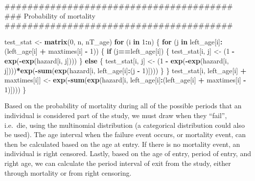 \documentclass[11pt,]{article}
\newenvironment{Shaded}{\begin{snugshade}}{\end{snugshade}}
\newcommand{\KeywordTok}[1]{\textcolor[rgb]{0.13,0.29,0.53}{\textbf{#1}}}
\newcommand{\DecValTok}[1]{\textcolor[rgb]{0.00,0.00,0.81}{#1}}
\newcommand{\StringTok}[1]{\textcolor[rgb]{0.31,0.60,0.02}{#1}}
\newcommand{\ControlFlowTok}[1]{\textcolor[rgb]{0.13,0.29,0.53}{\textbf{#1}}}
\newcommand{\OperatorTok}[1]{\textcolor[rgb]{0.81,0.36,0.00}{\textbf{#1}}}
\newcommand{\NormalTok}[1]{#1}
\begin{document}
\begin{Shaded}
\begin{Highlighting}[]
\NormalTok{  ########################################}
\NormalTok{  ### Probability of mortality}
\NormalTok{  ########################################}

\NormalTok{  test_stat <-}\StringTok{ }\KeywordTok{matrix}\NormalTok{(}\DecValTok{0}\NormalTok{, n, nT_age)}
  \ControlFlowTok{for}\NormalTok{ (i }\ControlFlowTok{in} \DecValTok{1}\OperatorTok{:}\NormalTok{n) \{}
    \ControlFlowTok{for}\NormalTok{ (j }\ControlFlowTok{in}\NormalTok{ left_age[i]}\OperatorTok{:}\NormalTok{(left_age[i] }\OperatorTok{+}\StringTok{ }\NormalTok{maxtimes[i] }\OperatorTok{-}\StringTok{ }\DecValTok{1}\NormalTok{)) \{}
      \ControlFlowTok{if}\NormalTok{ (j}\OperatorTok{==}\NormalTok{left_age[i]) \{}
\NormalTok{        test_stat[i, j] <-}\StringTok{ }\NormalTok{(}\DecValTok{1} \OperatorTok{-}\StringTok{ }\KeywordTok{exp}\NormalTok{(}\OperatorTok{-}\KeywordTok{exp}\NormalTok{(hazard[i, j])))}
\NormalTok{      \} }\ControlFlowTok{else}\NormalTok{ \{}
\NormalTok{        test_stat[i, j] <-}
\StringTok{          }\NormalTok{(}\DecValTok{1} \OperatorTok{-}\StringTok{ }\KeywordTok{exp}\NormalTok{(}\OperatorTok{-}\KeywordTok{exp}\NormalTok{(hazard[i, j])))}\OperatorTok{*}\KeywordTok{exp}\NormalTok{(}\OperatorTok{-}\KeywordTok{sum}\NormalTok{(}\KeywordTok{exp}\NormalTok{(hazard[i, left_age[i]}\OperatorTok{:}\NormalTok{(j }\OperatorTok{-}\StringTok{ }\DecValTok{1}\NormalTok{)])))}
\NormalTok{      \}}
\NormalTok{    \}}
\NormalTok{    test_stat[i, left_age[i] }\OperatorTok{+}\StringTok{ }\NormalTok{maxtimes[i]] <-}
\StringTok{          }\KeywordTok{exp}\NormalTok{(}\OperatorTok{-}\KeywordTok{sum}\NormalTok{(}\KeywordTok{exp}\NormalTok{(hazard[i, left_age[i]}\OperatorTok{:}\NormalTok{(left_age[i] }\OperatorTok{+}\StringTok{ }\NormalTok{maxtimes[i] }\OperatorTok{-}\StringTok{ }\DecValTok{1}\NormalTok{)])))}
\NormalTok{  \}}
\end{Highlighting}
\end{Shaded}

Based on the probability of mortality during all of the possible periods
that an individual is considered part of the study, we must draw when
they ``fail'', i.e.~die, using the multinomial distribution (a
categorical distribution could also be used). The age interval when the
failure event occurs, or mortality event, can then be calculated based
on the age at entry. If there is no mortality event, an individual is
right censored. Lastly, based on the age of entry, period of entry, and
right age, we can calculate the period interval of exit from the study,
either through mortality or from right censoring.
\end{document}
